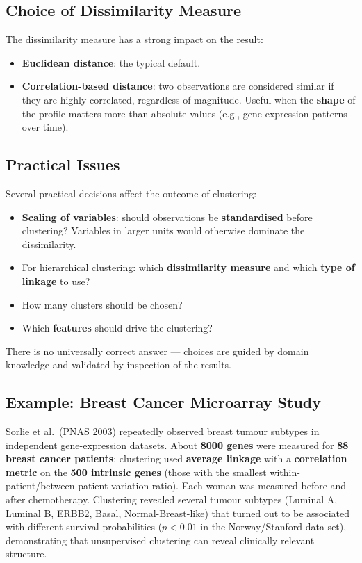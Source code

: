 \documentclass[11pt,a4paper]{article}
\theoremstyle{definition}
\theoremstyle{plain}
\theoremstyle{remark}
\begin{document}
\subsection{Choice of Dissimilarity Measure}

The dissimilarity measure has a strong impact on the result:
\begin{itemize}
    \item \textbf{Euclidean distance}: the typical default.
    \item \textbf{Correlation-based distance}: two observations are considered similar if they are highly correlated, regardless of magnitude. Useful when the \textbf{shape} of the profile matters more than absolute values (e.g., gene expression patterns over time).
\end{itemize}

\subsection{Practical Issues}

Several practical decisions affect the outcome of clustering:
\begin{itemize}
    \item \textbf{Scaling of variables}: should observations be \textbf{standardised} before clustering? Variables in larger units would otherwise dominate the dissimilarity.
    \item For hierarchical clustering: which \textbf{dissimilarity measure} and which \textbf{type of linkage} to use?
    \item How many clusters should be chosen?
    \item Which \textbf{features} should drive the clustering?
\end{itemize}
There is no universally correct answer — choices are guided by domain knowledge and validated by inspection of the results.

\subsection{Example: Breast Cancer Microarray Study}

Sorlie et al.\ (PNAS 2003) repeatedly observed breast tumour subtypes in independent gene-expression datasets. About \textbf{8000 genes} were measured for \textbf{88 breast cancer patients}; clustering used \textbf{average linkage} with a \textbf{correlation metric} on the \textbf{500 intrinsic genes} (those with the smallest within-patient/between-patient variation ratio). Each woman was measured before and after chemotherapy. Clustering revealed several tumour subtypes (Luminal A, Luminal B, ERBB2, Basal, Normal-Breast-like) that turned out to be associated with different survival probabilities ($p < 0.01$ in the Norway/Stanford data set), demonstrating that unsupervised clustering can reveal clinically relevant structure.
\end{document}
